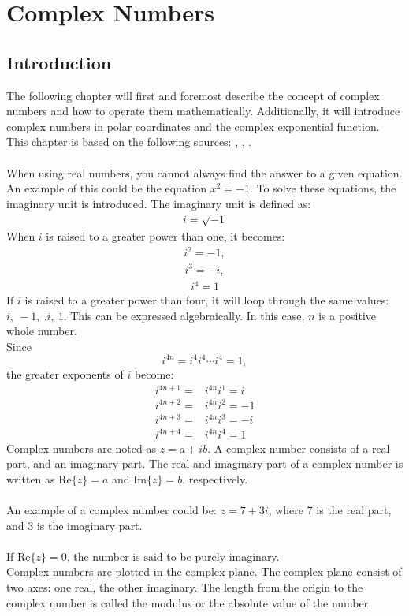 \chapter{Complex Numbers}

\section{Introduction}
The following chapter will first and foremost describe the concept of complex numbers and how to operate them mathematically. Additionally, it will introduce complex numbers in polar coordinates and the complex exponential function.
\\
This chapter is based on the following sources: \cite{complexpaul}, \cite{complexpurple}, \cite{complexnotebook}.
\\
\\
When using real numbers, you cannot always find the answer to a given equation. An example of this could be the equation $x^2=-1$. To solve these equations, the imaginary unit is introduced. The imaginary unit is defined as:
\begin{align*}
i=\sqrt{-1}
\end{align*}
When $i$ is raised to a greater power than one, it becomes:
\begin{align*}
i^2=-1,
\end{align*}
\begin{align*}
i^3=-i,
\end{align*}
\begin{align*}
i^4=1
\end{align*}
If $i$ is raised to a greater power than four, it will loop through the same values: $i, \ -1, \ .i, \ 1$. This can be expressed algebraically. In this case, $n$ is a  positive whole number. 
\\
Since $$i^{4n} = i^4i^4\cdots i^4 = 1,$$
the greater exponents of $i$ become:
\begin{align*}
	i^{4n+1} =& i^{4n}i^1 = i \\
	i^{4n+2} =& i^{4n}i^2 = -1 \\
	i^{4n+3} =& i^{4n}i^3 = -i \\
	i^{4n+4} =& i^{4n}i^4 = 1
\end{align*}
Complex numbers are noted as $z = a+ib$. A complex number consists of a real part, and an imaginary part. The real and imaginary part of a complex number is written as $\text{Re}\{z\}=a$ and $\text{Im}\{z\}=b$, respectively.
\\
\\
An example of a complex number could be: $z=7+3i$, where 7 is the real part, and 3 is the imaginary part. 
\\
\\
If $\text{Re}\{z\}=0$, the number is said to be purely imaginary.  
\\
Complex numbers are plotted in the complex plane. The complex plane consist of two axes: one real, the other imaginary.
The length from the origin to the complex number is called the modulus or the absolute value of the number.

